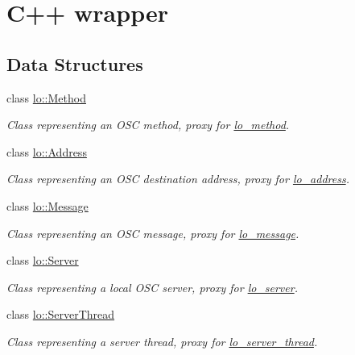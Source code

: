 \hypertarget{group__liblocpp}{\section{C++ wrapper}
\label{group__liblocpp}
}
\subsection*{Data Structures}
\begin{DoxyCompactItemize}
\item 
class \hyperlink{classlo_1_1Method}{lo\+::\+Method}
\begin{DoxyCompactList}\small\item\em Class representing an O\+S\+C method, proxy for \hyperlink{lo__types_8h_a66faedf5da13231d8c0166870477dce5}{lo\+\_\+method}. \end{DoxyCompactList}\item 
class \hyperlink{classlo_1_1Address}{lo\+::\+Address}
\begin{DoxyCompactList}\small\item\em Class representing an O\+S\+C destination address, proxy for \hyperlink{lo__types_8h_abf9b53223467de596b89e1377b0f3f3d}{lo\+\_\+address}. \end{DoxyCompactList}\item 
class \hyperlink{classlo_1_1Message}{lo\+::\+Message}
\begin{DoxyCompactList}\small\item\em Class representing an O\+S\+C message, proxy for \hyperlink{lo__types_8h_ad126083c98d941f00eb72d1690b38d63}{lo\+\_\+message}. \end{DoxyCompactList}\item 
class \hyperlink{classlo_1_1Server}{lo\+::\+Server}
\begin{DoxyCompactList}\small\item\em Class representing a local O\+S\+C server, proxy for \hyperlink{lo__types_8h_a59067bf50cf8abb4371da6f03c9036c9}{lo\+\_\+server}. \end{DoxyCompactList}\item 
class \hyperlink{classlo_1_1ServerThread}{lo\+::\+Server\+Thread}
\begin{DoxyCompactList}\small\item\em Class representing a server thread, proxy for \hyperlink{lo__types_8h_a09996ffb6bde21b8fb6106897b88feae}{lo\+\_\+server\+\_\+thread}. \end{DoxyCompactList}\item 

\end{DoxyCompactItemize}
